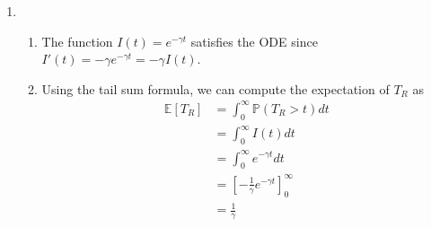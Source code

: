 \documentclass{article}
\newcommand{\rr}{\mathscr{R}_0}
\begin{document}
\begin{enumerate}
\begin{enumerate}
		\item We can find an alternative equality for $\beta \sum_{j=1}^\infty \frac{I_j}{N} $ and subsitute it into the previous equation. We can find this with the $\Delta (S+I)_j$ terms we defined earlier.
			\begin{align*}
				\Delta (S+I)_j &= (\sigma-1) I_{j-1} \\
				\sum_{j=1}^{m+1} \Delta (S+I)_j &= -(1-\sigma) \sum_{j=0}^{m} I_j \\
				-\frac{\beta}{N(1-\sigma)} \sum_{j=1}^{m+1} \Delta (S+I)_j &= \beta \sum_{j=0}^{m} \frac{I_j}{N} 
				\intertext{Since we are defining $\rr = \frac{\beta}{1-\sigma} $ and since $\sum_{j=1}^{m+1} \Delta (S+I)_j = (S+I)_{m+1} - (S+I)_0$, this simplifies to}
				-\frac{\rr}{N} \left( (S+I)_{m+1} - (S+I)_0 \right) &= \beta \sum_{j=0}^{m} \frac{I_j}{N}
				\intertext{By assumption, $S_0 + I_0 = N$, so this can be reduced further to}
				\rr \left( 1 - \frac{(S+I)_{m+1}}{N} \right) &= \beta \sum_{j=0}^{m} \frac{I_j}{N}
				\intertext{Finally, we can take the limit as $m \to \infty$ and use the fact that $(S+I)_{\infty} = S_\infty$ to get}
				\rr \left( 1 - \frac{S_{\infty}}{N} \right) &= \beta \sum_{j=0}^{m} \frac{I_j}{N}
			\end{align*}
			Substituting this into the final equality from part (iii) gives
			\[
				\log \frac{S_0}{S_\infty} = \rr \left( 1 - \frac{S_\infty}{N}  \right)
			\] 
			as desired.
		\end{enumerate}

	\item
	\begin{enumerate}
		\item The function $I(t) = e^{-\gamma t}$ satisfies the ODE since $I'(t) = -\gamma e^{-\gamma t} = -\gamma I(t)$.

		\item Using the tail sum formula, we can compute the expectation of $T_ R$ as
			\begin{align*}
				\mathbb{E}[T_R] &= \int_{0}^{\infty} \mathbb{P}(T_R > t) dt \\
						&= \int_{0}^{\infty} I(t) dt \\
						&= \int_{0}^{\infty} e^{-\gamma t} dt \\
						&= \left[ -\frac{1}{\gamma} e^{-\gamma t} \right]_0^\infty \\
						&= \frac{1}{\gamma} 
			\end{align*}
	\end{enumerate}


\end{enumerate}
\end{document}
